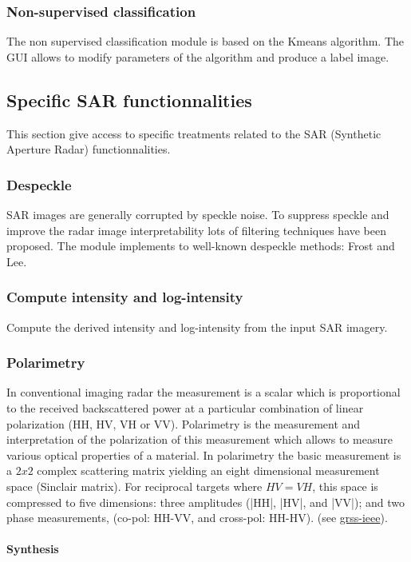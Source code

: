 \subsubsection{Non-supervised classification}
The non supervised classification module is based on the Kmeans
algorithm.  The GUI allows to modify parameters of the algorithm and
produce a label image.

\subsection{Specific SAR functionnalities}
This section give access to specific treatments related to the SAR
(Synthetic Aperture Radar) functionnalities.

\subsubsection{Despeckle}
SAR images are generally corrupted by speckle noise. To suppress 
speckle and improve the radar image interpretability lots of filtering 
techniques have been proposed.  The module implements to well-known 
despeckle methods: Frost and Lee.

\subsubsection{Compute intensity and log-intensity}
Compute the derived intensity and log-intensity from the input SAR imagery.

\subsubsection{Polarimetry}
In conventional imaging radar the measurement is a scalar which is 
proportional to the received backscattered power at a particular combination 
of linear polarization (HH, HV, VH or VV). 
Polarimetry is the measurement and interpretation of the polarization of this measurement which
allows to measure various optical properties of a material.
In polarimetry the basic measurement is a $2x2$ complex scattering
matrix yielding an eight dimensional measurement space (Sinclair
matrix). For reciprocal targets where $HV=VH$, this space is
compressed to five dimensions: three amplitudes (|HH|, |HV|, and
|VV|); and two phase measurements, (co-pol: HH-VV, and cross-pol:
HH-HV). (see
\href{http://www.grss-ieee.org/technical-briefs/imaging-radar-polarimetry}{grss-ieee}).
 
\paragraph{Synthesis} \\

